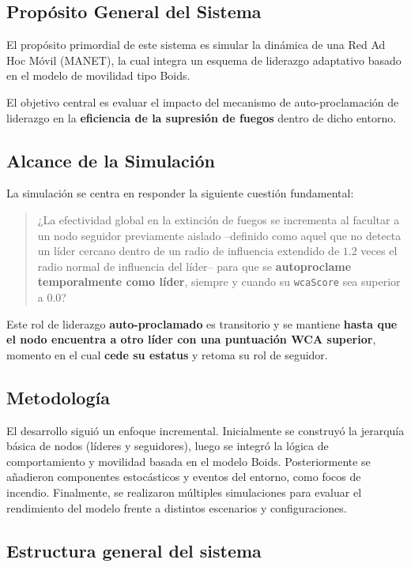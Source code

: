 \documentclass{article}
\begin{document}
\subsection*{Propósito General del Sistema}

El propósito primordial de este sistema es simular la dinámica de una Red Ad Hoc Móvil (MANET), la cual integra un esquema de liderazgo adaptativo basado en el modelo de movilidad tipo Boids. 

El objetivo central es evaluar el impacto del mecanismo de auto-proclamación de liderazgo en la \textbf{eficiencia de la supresión de fuegos} dentro de dicho entorno.

\subsection*{Alcance de la Simulación}

La simulación se centra en responder la siguiente cuestión fundamental:

\begin{quote}
¿La efectividad global en la extinción de fuegos se incrementa al facultar a un nodo seguidor previamente aislado –definido como aquel que no detecta un líder cercano dentro de un radio de influencia extendido de $1.2$ veces el radio normal de influencia del líder– para que se \textbf{autoproclame temporalmente como líder}, siempre y cuando su \texttt{wcaScore} sea superior a 0.0?
\end{quote}

Este rol de liderazgo \textbf{auto-proclamado} es transitorio y se mantiene \textbf{hasta que el nodo encuentra a otro líder con una puntuación WCA superior}, momento en el cual \textbf{cede su estatus} y retoma su rol de seguidor.

\subsection{Metodología}

El desarrollo siguió un enfoque incremental. Inicialmente se construyó la jerarquía básica de nodos (líderes y seguidores), luego se integró la lógica de comportamiento y movilidad basada en el modelo Boids. Posteriormente se añadieron componentes estocásticos y eventos del entorno, como focos de incendio. Finalmente, se realizaron múltiples simulaciones para evaluar el rendimiento del modelo frente a distintos escenarios y configuraciones.

\subsection{Estructura general del sistema}
\end{document}
